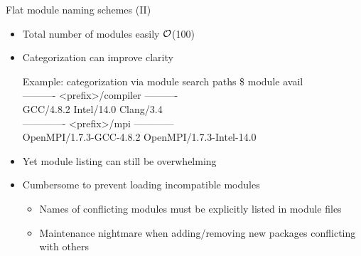 \documentclass[10pt,xcolor={usenames,dvipsnames}]{beamer}
\begin{document}

\begin{frame}{Flat module naming schemes (II)}
\begin{itemize}
    \item
        Total number of modules easily $\cal{O}$(100)
    \item
        Categorization can improve clarity\\
        \enskip
        \begin{minipage}{0.9\textwidth}
            \begin{exampleblock}{Example: categorization via module search paths}
                \ttfamily
                \$ module avail\\
                ---------- <prefix>/compiler ----------\\
                GCC/4.8.2 \quad Intel/14.0 \quad Clang/3.4\\
                ------------- <prefix>/mpi ------------\\
                OpenMPI/1.7.3-GCC-4.8.2 \quad OpenMPI/1.7.3-Intel-14.0
            \end{exampleblock}
        \end{minipage}
    \smallskip
    \item
        Yet module listing can still be overwhelming
    \item
        Cumbersome to prevent loading incompatible modules
        \begin{itemize}
            \item
                Names of conflicting modules must be explicitly listed in module files
            \item
                Maintenance nightmare when adding/removing new packages
                conflicting with others
        \end{itemize}
\end{itemize}
\end{frame}

\end{document}
